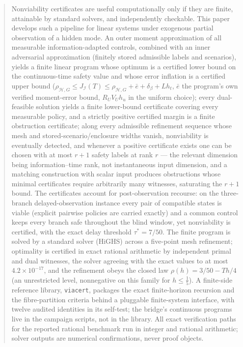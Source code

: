 \documentclass[10pt,twocolumn]{article}
\theoremstyle{plain}
\theoremstyle{definition}
\theoremstyle{remark}
\begin{document}
\begin{abstract}
Nonviability certificates are useful computationally only if they are finite,
attainable by standard solvers, and independently checkable. This paper
develops such a pipeline for linear systems under exogenous partial
observation of a hidden mode. An outer moment approximation of all measurable
information-adapted controls, combined with an inner adversarial approximation (finitely stored
admissible labels and scenarios), yields a finite linear program whose
optimum is a certified lower bound on the continuous-time safety value and
whose error inflation is a certified upper bound
(\(\rho_{\mathcal{H},G} \le J_{\mathcal{I}}(T) \le \rho_{\mathcal{H},G} +
\bar{e} + \delta_\beta + L h_t\), \(\bar{e}\) the program's own verified
moment-error bound, \(R_U V_U h_u\) in the uniform choice); every dual-feasible solution yields a finite lower-bound certificate
covering every measurable policy, and a strictly positive certified margin
is a finite obstruction certificate; along every admissible refinement
sequence whose mesh and stored-scenario/enclosure widths vanish,
nonviability is eventually detected, and whenever a positive certificate exists one can be
chosen with at most \(r + 1\) safety labels at rank \(r\) --- the relevant
dimension being information--time rank, not instantaneous input dimension,
and a matching construction with scalar input produces obstructions whose
minimal certificates require arbitrarily many witnesses, saturating the
\(r + 1\) bound. The certificates account for post-observation
recourse: on the three-branch delayed-observation instance every pair of compatible
states is viable (explicit pairwise policies are carried exactly) and a
common control keeps every branch safe throughout the blind window, yet nonviability is certified, with the exact
delay threshold \(\tau^{*} = 7/50\). The finite program is solved by a
standard solver (HiGHS) across a five-point mesh refinement; optimality is
certified in exact rational arithmetic by independent primal and dual
witnesses, the solver agreeing with the exact values to at most
\(4.2 \times 10^{-17}\), and the refinement obeys the closed law
\(\rho(h) = 3/50 - Th/4\) (an unrestricted level, nonnegative on this
family for \(h \le \tfrac15\)). A finite-side reference library,
\texttt{viacert}, packages the exact finite-horizon recursion and the
fibre-partition criteria behind a pluggable finite-system interface, with
twelve audited identities in its self-test; the bridge's continuous
programs live in the campaign scripts, not in the library. All exact verification paths for the reported rational benchmark run in
integer and rational arithmetic; solver outputs are numerical
confirmations, never proof objects.
\end{abstract}
\end{document}
